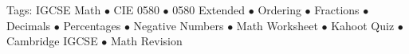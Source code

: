 \documentclass[11pt,a4paper]{article}
\begin{document}
\vspace{14pt}
\begin{center}
  \sffamily\scriptsize\textcolor{textmuted}{
    Tags: IGCSE Math $\bullet$ CIE 0580 $\bullet$ 0580 Extended $\bullet$ Ordering $\bullet$ Fractions $\bullet$ Decimals $\bullet$ Percentages $\bullet$ Negative Numbers $\bullet$ Math Worksheet $\bullet$ Kahoot Quiz $\bullet$ Cambridge IGCSE $\bullet$ Math Revision
  }
\end{center}
\end{document}
